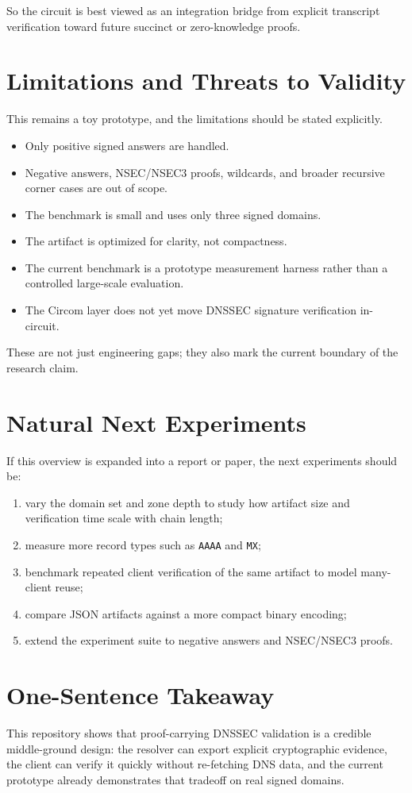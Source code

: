 \documentclass[11pt]{article}
\begin{document}
So the circuit is best viewed as an integration bridge from explicit transcript verification toward future succinct or zero-knowledge proofs.

\section{Limitations and Threats to Validity}

This remains a toy prototype, and the limitations should be stated explicitly.

\begin{itemize}[nosep]
    \item Only positive signed answers are handled.
    \item Negative answers, NSEC/NSEC3 proofs, wildcards, and broader recursive corner cases are out of scope.
    \item The benchmark is small and uses only three signed domains.
    \item The artifact is optimized for clarity, not compactness.
    \item The current benchmark is a prototype measurement harness rather than a controlled large-scale evaluation.
    \item The Circom layer does not yet move DNSSEC signature verification in-circuit.
\end{itemize}

These are not just engineering gaps; they also mark the current boundary of the research claim.

\section{Natural Next Experiments}

If this overview is expanded into a report or paper, the next experiments should be:

\begin{enumerate}[nosep]
    \item vary the domain set and zone depth to study how artifact size and verification time scale with chain length;
    \item measure more record types such as \texttt{AAAA} and \texttt{MX};
    \item benchmark repeated client verification of the same artifact to model many-client reuse;
    \item compare JSON artifacts against a more compact binary encoding;
    \item extend the experiment suite to negative answers and NSEC/NSEC3 proofs.
\end{enumerate}

\section{One-Sentence Takeaway}

This repository shows that proof-carrying DNSSEC validation is a credible middle-ground design: the resolver can export explicit cryptographic evidence, the client can verify it quickly without re-fetching DNS data, and the current prototype already demonstrates that tradeoff on real signed domains.
\end{document}
